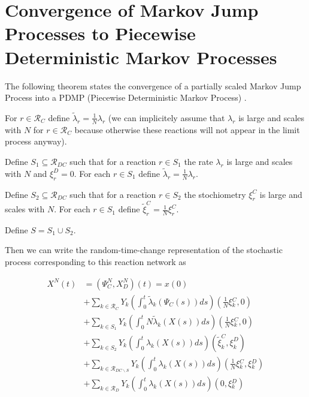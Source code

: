 \documentclass[english]{article}
\begin{document}
\section{Convergence of Markov Jump Processes to Piecewise
    Deterministic Markov Processes}

\label{sub:PDMP_convergence}

The following theorem states the convergence of a partially scaled
Markov Jump Process into a PDMP (Piecewise Deterministic Markov
Process) \cite{davis1984piecewise}.

For $r \in \mathcal{R}_{C}$ define
$\tilde{\lambda}_{r} = \frac{1}{N} \lambda_{r}$
(we can implicitely assume that $\lambda_{r}$ is large and scales
with $N$ for $r\in\mathcal{R}_{C}$ because otherwise these reactions
will not appear in the limit process anyway).

Define $S_{1} \subseteq \mathcal{R}_{DC}$ such that for a reaction
$r \in S_{1}$ the rate $\lambda_{r}$ is large and scales with $N$
and $\xi_{r}^{D} = 0$. For each $r \in S_{1}$ define
$\tilde{\lambda}_{r} = \frac{1}{N} \lambda_{r}$.

Define $S_{2} \subseteq \mathcal{R}_{DC}$ such that for a reaction
$r \in S_{2}$ the stochiometry $\xi_{r}^{C}$ is large and scales
with $N$. For each $r \in S_{1}$ define
$\tilde{\xi}_{r}^{C} = \frac{1}{N} \xi_{r}^{C}$.

Define $S = S_{1} \cup S_{2}$.

Then we can write the random-time-change representation of the
stochastic process corresponding to this reaction network as

\begin{align*}
X^{N}(t) & = \left( \Psi_{C}^{N},X_{D}^{N} \right)(t) = x(0) \\
    & + \sum_{k \in \mathcal{R}_{C}} Y_{k} \left(
        \int_{0}^{t} \tilde{\lambda}_{k} \left( \Psi_{C}(s) \right) ds
    \right) \left( \frac{1}{N} \xi{}_{k}^{C}, 0 \right) \\
    & + \sum_{k \in S_{1}}Y_{k} \left(
        \int_{0}^{t} N \tilde{\lambda}_{k} \left( X(s) \right) ds
    \right) \left( \frac{1}{N} \xi{}_{k}^{C}, 0 \right) \\
    & + \sum_{k \in S_{2}}Y_{k} \left(
        \int_{0}^{t} \lambda_{k} \left( X(s) \right) ds
    \right) \left( \tilde{\xi}_{k}^{C}, \xi_{k}^{D} \right) \\
    & + \sum_{k \in \mathcal{R}_{DC \backslash S}} Y_{k} \left(
        \int_{0}^{t} \lambda_{k} \left( X(s) \right) ds
    \right) \left( \frac{1}{N} \xi{}_{k}^{C}, \xi{}_{k}^{D} \right) \\
    & + \sum_{k \in \mathcal{R}_{D}} Y_{k} \left(
        \int_{0}^{t} \lambda_{k} \left( X(s) \right) ds
    \right) \left( 0, \xi{}_{k}^{D} \right)
\end{align*}
\end{document}
